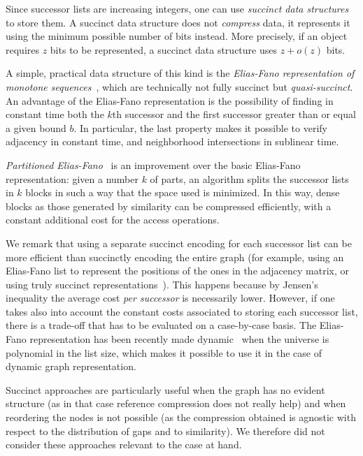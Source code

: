 Since successor lists are increasing integers, one can use \emph{succinct data
  structures}~\cite{NavCDS} to store them. A succinct data structure does not
\emph{compress} data, it represents it using the minimum possible number of
bits instead.
More precisely, if an object requires $z$ bits to be represented, a succinct
data structure uses $z+o(z)$ bits.

A simple, practical data structure of this kind is the \emph{Elias-Fano
representation of monotone sequences}~\cite{EliESRCASF}, which are technically
not fully succinct but \emph{quasi-succinct}.
An advantage of the
Elias-Fano representation is the possibility of finding in constant time both
the $k$th successor and the first successor greater than or equal a
given bound $b$. In particular, the last property makes it possible to verify
adjacency in constant time, and neighborhood intersections in sublinear time.

\emph{Partitioned Elias-Fano}~\cite{OtVPEFI} is an improvement over the basic
Elias-Fano representation: given a number $k$ of parts, an algorithm splits
the successor lists in $k$ blocks in such a way that the space used is
minimized. In this way, dense blocks as those generated by similarity can be
compressed efficiently, with a constant additional cost for the access
operations.

We remark that using a separate succinct encoding for each successor list can
be more efficient than succinctly encoding the entire graph (for example, using
an Elias-Fano list to represent the positions of the ones in the adjacency
matrix, or using truly succinct representations~\cite{FaMSEAG}). This happens
because by Jensen's inequality the average cost \emph{per successor} is
necessarily lower.  However, if one takes also into account the constant costs
associated to storing each successor list, there is a trade-off that has to be
evaluated on a case-by-case basis.  The Elias-Fano representation has been
recently made dynamic~\cite{PiVDEFR} when the universe is polynomial in the
list size, which makes it possible to use it in the case of dynamic graph
representation.

Succinct approaches are particularly useful when the graph has no evident
structure (as in that case reference compression does not really help) and when
reordering the nodes is not possible (as the compression obtained is agnostic
with respect to the distribution of gaps and to similarity). We therefore did
not consider these approaches relevant to the case at hand.

